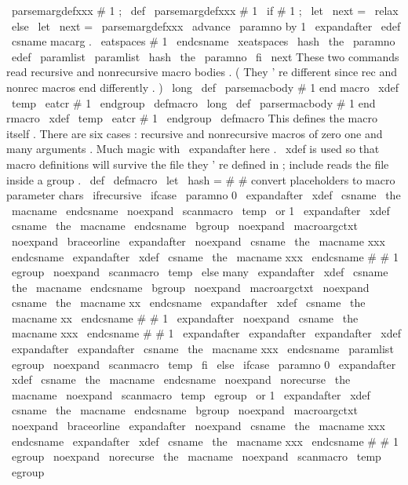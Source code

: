 {{\
parsemargdefxxx
#
1
;
}
\
def
\
parsemargdefxxx
#
1
{
%
\
if
#
1
;
\
let
\
next
=
\
relax
\
else
\
let
\
next
=
\
parsemargdefxxx
\
advance
\
paramno
by
1
%
\
expandafter
\
edef
\
csname
macarg
.
\
eatspaces
{
#
1
}
\
endcsname
{
\
xeatspaces
{
\
hash
\
the
\
paramno
}
}
%
\
edef
\
paramlist
{
\
paramlist
\
hash
\
the
\
paramno
}
%
\
fi
\
next
}
%
These
two
commands
read
recursive
and
nonrecursive
macro
bodies
.
%
(
They
'
re
different
since
rec
and
nonrec
macros
end
differently
.
)
\
long
\
def
\
parsemacbody
#
1
end
macro
%
{
\
xdef
\
temp
{
\
eatcr
{
#
1
}
}
\
endgroup
\
defmacro
}
%
\
long
\
def
\
parsermacbody
#
1
end
rmacro
%
{
\
xdef
\
temp
{
\
eatcr
{
#
1
}
}
\
endgroup
\
defmacro
}
%
%
This
defines
the
macro
itself
.
There
are
six
cases
:
recursive
and
%
nonrecursive
macros
of
zero
one
and
many
arguments
.
%
Much
magic
with
\
expandafter
here
.
%
\
xdef
is
used
so
that
macro
definitions
will
survive
the
file
%
they
'
re
defined
in
;
include
reads
the
file
inside
a
group
.
\
def
\
defmacro
{
%
\
let
\
hash
=
#
#
%
convert
placeholders
to
macro
parameter
chars
\
ifrecursive
\
ifcase
\
paramno
%
0
\
expandafter
\
xdef
\
csname
\
the
\
macname
\
endcsname
{
%
\
noexpand
\
scanmacro
{
\
temp
}
}
%
\
or
%
1
\
expandafter
\
xdef
\
csname
\
the
\
macname
\
endcsname
{
%
\
bgroup
\
noexpand
\
macroargctxt
\
noexpand
\
braceorline
\
expandafter
\
noexpand
\
csname
\
the
\
macname
xxx
\
endcsname
}
%
\
expandafter
\
xdef
\
csname
\
the
\
macname
xxx
\
endcsname
#
#
1
{
%
\
egroup
\
noexpand
\
scanmacro
{
\
temp
}
}
%
\
else
%
many
\
expandafter
\
xdef
\
csname
\
the
\
macname
\
endcsname
{
%
\
bgroup
\
noexpand
\
macroargctxt
\
noexpand
\
csname
\
the
\
macname
xx
\
endcsname
}
%
\
expandafter
\
xdef
\
csname
\
the
\
macname
xx
\
endcsname
#
#
1
{
%
\
expandafter
\
noexpand
\
csname
\
the
\
macname
xxx
\
endcsname
#
#
1
}
%
\
expandafter
\
expandafter
\
expandafter
\
xdef
\
expandafter
\
expandafter
\
csname
\
the
\
macname
xxx
\
endcsname
\
paramlist
{
\
egroup
\
noexpand
\
scanmacro
{
\
temp
}
}
%
\
fi
\
else
\
ifcase
\
paramno
%
0
\
expandafter
\
xdef
\
csname
\
the
\
macname
\
endcsname
{
%
\
noexpand
\
norecurse
{
\
the
\
macname
}
%
\
noexpand
\
scanmacro
{
\
temp
}
\
egroup
}
%
\
or
%
1
\
expandafter
\
xdef
\
csname
\
the
\
macname
\
endcsname
{
%
\
bgroup
\
noexpand
\
macroargctxt
\
noexpand
\
braceorline
\
expandafter
\
noexpand
\
csname
\
the
\
macname
xxx
\
endcsname
}
%
\
expandafter
\
xdef
\
csname
\
the
\
macname
xxx
\
endcsname
#
#
1
{
%
\
egroup
\
noexpand
\
norecurse
{
\
the
\
macname
}
%
\
noexpand
\
scanmacro
{
\
temp
}
\
egroup
}
%
\
}}
